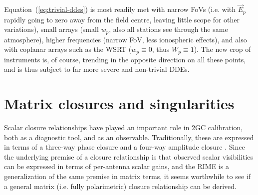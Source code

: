 \documentclass{aa}
\newcommand{\jones}[2]{\vec {#1}_{#2}}
\newcommand{\coh}[2]{\mathsf{{#1}}_{{#2}}}
\begin{document}
Equation~(\ref{eq:trivial-ddes}) is most readily met with narrow FoVs (i.e. with $\jones{E}{p}$ rapidly going to zero away from the field centre, leaving little scope for other variations), small arrays (small $w_p$, also all stations see through the same atmosphere), higher frequencies (narrow FoV, less ionospheric effects), and also with coplanar arrays such as the WSRT ($w_p\equiv0$, thus $W_p\equiv1$). The new crop of instruments is, of course, trending in the opposite direction on all these points, and is thus subject to far more severe and non-trivial DDEs.


% 
% 
% 
% 
% 

\section{Matrix closures and singularities\label{sec:closures}}

Scalar closure relationships have played an important role in 2GC calibration, both as a diagnostic tool, and as an observable. Traditionally, these are expressed in terms of a three-way phase closure and a four-way amplitude closure \citep[see e.g.][Sect.~10.3]{tms}. Since the underlying premise of a closure relationship is that observed scalar visibilities can be expressed in terms of per-antenna scalar gains, and the RIME is a generalization of the same premise in matrix terms, it seems worthwhile to see if a general matrix (i.e. fully polarimetric) closure relationship can be derived.
\end{document}
